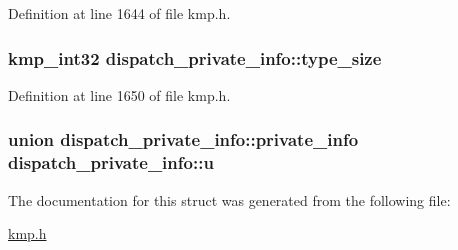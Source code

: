 Definition at line 1644 of file kmp.\-h.

\hypertarget{structdispatch__private__info_ad6c8ec5e16b0e4109cc12de869a10b67}{
\subsubsection[{type\-\_\-size}]{\setlength{\rightskip}{0pt plus 5cm}kmp\-\_\-int32 dispatch\-\_\-private\-\_\-info\-::type\-\_\-size}}\label{structdispatch__private__info_ad6c8ec5e16b0e4109cc12de869a10b67}


Definition at line 1650 of file kmp.\-h.

\hypertarget{structdispatch__private__info_add5d0eaadae18cc00b471cbb7a147c3e}{
\subsubsection[{u}]{\setlength{\rightskip}{0pt plus 5cm}union {\bf dispatch\-\_\-private\-\_\-info\-::private\-\_\-info}  dispatch\-\_\-private\-\_\-info\-::u}}\label{structdispatch__private__info_add5d0eaadae18cc00b471cbb7a147c3e}


The documentation for this struct was generated from the following file\-:\begin{DoxyCompactItemize}
\item 
\hyperlink{kmp_8h}{kmp.\-h}\end{DoxyCompactItemize}
